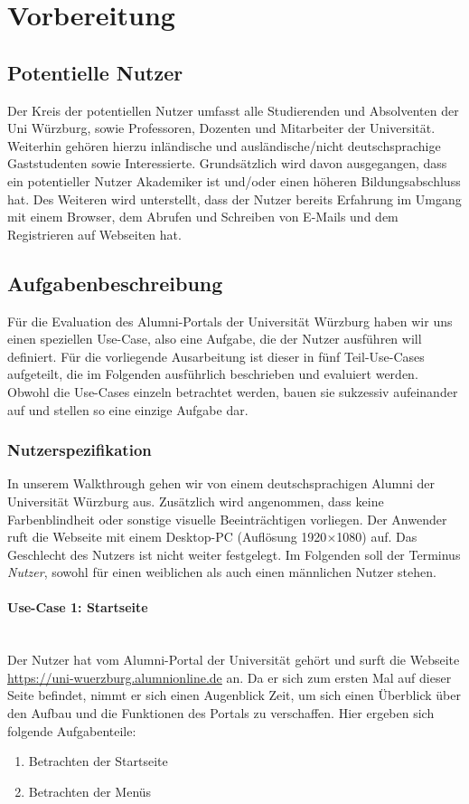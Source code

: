 \section{Vorbereitung}
\subsection{Potentielle Nutzer}
Der Kreis der potentiellen Nutzer umfasst alle Studierenden und Absolventen der Uni Würzburg, sowie Professoren, Dozenten und Mitarbeiter der Universität. Weiterhin gehören hierzu inländische und ausländische/nicht deutschsprachige Gaststudenten sowie Interessierte. Grundsätzlich wird davon ausgegangen, dass ein potentieller Nutzer Akademiker ist und/oder einen höheren Bildungsabschluss hat. Des Weiteren wird unterstellt, dass der Nutzer bereits Erfahrung im Umgang mit einem Browser, dem Abrufen und Schreiben von E-Mails und dem Registrieren auf Webseiten hat. 

\subsection{Aufgabenbeschreibung}
Für die Evaluation des Alumni-Portals der Universität Würzburg haben wir uns einen speziellen Use-Case, also eine Aufgabe, die der Nutzer ausführen will definiert. 
Für die vorliegende Ausarbeitung ist dieser in fünf Teil-Use-Cases aufgeteilt, die im Folgenden ausführlich beschrieben und evaluiert werden. Obwohl die Use-Cases einzeln betrachtet werden, bauen sie sukzessiv aufeinander auf und stellen so eine einzige Aufgabe dar.

\subsubsection*{Nutzerspezifikation}
In unserem Walkthrough gehen wir von einem deutschsprachigen Alumni der Universität Würzburg aus. Zusätzlich wird angenommen, dass keine Farbenblindheit oder sonstige visuelle Beeinträchtigen vorliegen. 
Der Anwender ruft die Webseite mit einem Desktop-PC (Auflösung 1920$\times$1080) auf. 
Das Geschlecht des Nutzers ist nicht weiter festgelegt. Im Folgenden soll der Terminus \emph{Nutzer}, sowohl für einen weiblichen als auch einen männlichen Nutzer stehen.

\paragraph{Use-Case 1: Startseite}\quad\\
Der Nutzer hat vom Alumni-Portal der Universität gehört und surft die Webseite \url{https://uni-wuerzburg.alumnionline.de} an. Da er sich zum ersten Mal auf dieser Seite befindet, nimmt er sich einen Augenblick Zeit, um sich einen Überblick über den Aufbau und die Funktionen des Portals zu verschaffen.
Hier ergeben sich folgende Aufgabenteile:
\begin{enumerate}

		\item Betrachten der Startseite
		\item Betrachten der Menüs
\end{enumerate}

